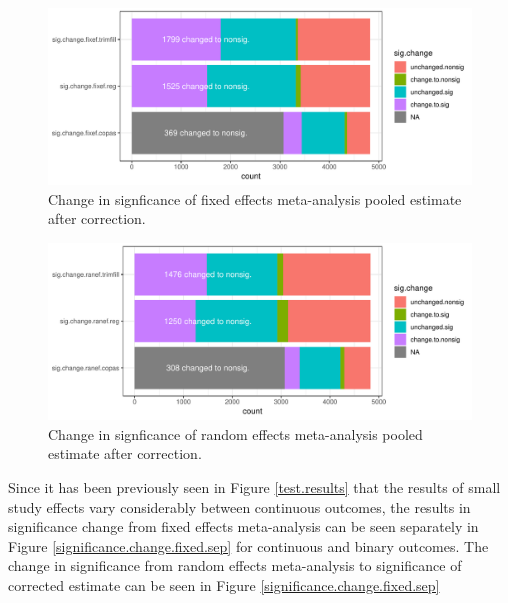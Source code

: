 \documentclass[11pt,a4paper,twoside]{book}\usepackage[]{graphicx}\usepackage[]{color}
\newenvironment{knitrout}{}{} %
\begin{document}
\begin{figure}
\begin{knitrout}
\color{fgcolor}

{\centering \includegraphics[width=\textwidth-3cm]{figure/ch02_figunnamed-chunk-30-1} 

}



\end{knitrout}
\caption{Change in signficance of fixed effects meta-analysis pooled estimate after correction.}
\label{significance.change.fixed}
\end{figure}

\begin{figure}
\begin{knitrout}
\color{fgcolor}

{\centering \includegraphics[width=\textwidth-3cm]{figure/ch02_figunnamed-chunk-31-1} 

}



\end{knitrout}
\caption{Change in signficance of random effects meta-analysis pooled estimate after correction.}
\label{significance.change.random}
\end{figure}

Since it has been previously seen in Figure \ref{test.results} that the results of small study effects vary considerably between continuous outcomes, the results in significance change from fixed effects meta-analysis can be seen separately in Figure \ref{significance.change.fixed.sep} for continuous and binary outcomes. The change in significance from random effects meta-analysis to significance of corrected estimate can be seen in Figure \ref{significance.change.fixed.sep}
\end{document}
